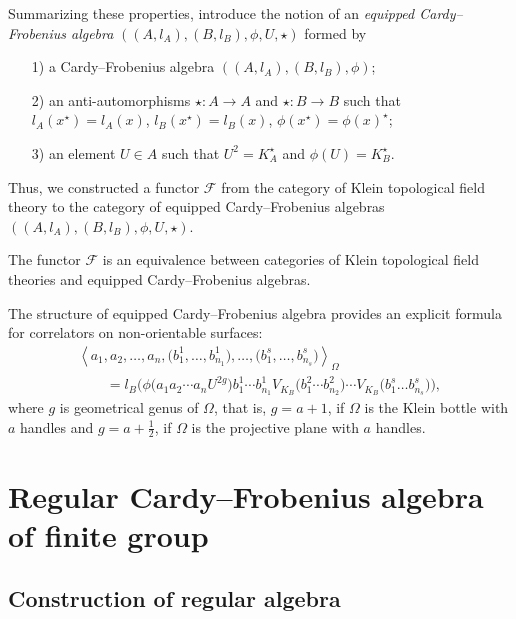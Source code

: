 \documentclass[pdftex]{sigma}
\def \lc {\left<}
\def \rc {\right>}
\begin{document}
Summarizing these properties, introduce the notion of
an \textit{equipped Cardy--Frobenius algebra} $((A,l_A),(B,l_B),\phi,U,\star)$ formed by
\begin{enumerate}\itemsep=0pt
\item[1)] a Cardy--Frobenius algebra $((A,l_A),(B,l_B),\phi)$;

\item[2)] an anti-automorphisms $\star :A\rightarrow A$ and $\star : B\rightarrow
B$ such
that $l_A(x^\star)=l_A(x)$, $l_B(x^\star)=l_B(x)$, $\phi(x^\star)=\phi(x)^\star$;

\item[3)] an element $U\in A$ such that $U^2=K_A^\star$ and $\phi(U)=K_B^\star$.
\end{enumerate}

Thus, we constructed a functor $\mathcal{F}$ from the category of
Klein topological f\/ield theory to the category of equipped
Cardy--Frobenius algebras $((A,l_A),(B,l_B),\phi,U,\star)$.


\begin{theorem}[\cite{AN}] The functor $\mathcal{F}$
is an equivalence between categories of Klein topological field
theories and equipped Cardy--Frobenius algebras.
\end{theorem}

The structure of equipped Cardy--Frobenius algebra provides an explicit
formula for
correlators on non-orientable surfaces:
\begin{gather*}
\lc a_1,a_2,\dots,a_n,\big(b^1_1,\dots,b^1_{n_1}\big),\dots,
\big(b^s_1,\dots,b^s_{n_s}\big)\rc_{\Omega}\\
\qquad{}=
l_B\big( \phi\big(a_1 a_2 \cdots a_n U^{2g}\big) b^1_1 \cdots b^1_{n_1} V_{K_B}\big(b^2_1 \cdots b^2_{n_2}\big) \cdots
V_{K_B}\big(b^s_1\dots b^s_{n_s}\big)\big),
\end{gather*}
where $g$ is geometrical genus of $\Omega$, that is, $g=a+1$, if $\Omega$ is the Klein bottle
with $a$ handles and $g=a+\frac{1}{2}$, if $\Omega$ is the projective
plane with $a$ handles.


\section[Regular Cardy-Frobenius algebra of finite group]{Regular Cardy--Frobenius algebra of f\/inite group}\label{s3}

\subsection{Construction of regular algebra}\label{s3.1}
\end{document}
